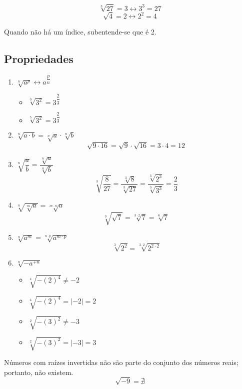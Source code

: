 \documentclass[letterpaper]{book}
\begin{document}
\[\sqrt[3]{27} = 3 \leftrightarrow 3^{3} = 27\]
\[\sqrt{4} = 2 \leftrightarrow 2^{2} = 4\]

Quando não há um índice, subentende-se que é 2.

\subsection{Propriedades}
\begin{enumerate}
    \item \(\sqrt[n]{a^{p}} \leftrightarrow a^{\dfrac{p}{n}}\)
        \begin{itemize}
            \item \(\sqrt[3]{3^{2}} = 3^{\dfrac{2}{3}}\)
            \item \(\sqrt[5]{3^{2}} = 3^{\dfrac{2}{3}}\)
        \end{itemize}
    
    \item \(\sqrt[n]{a \cdot b} = \sqrt[n]{a} \cdot \sqrt[n]{b}\)
        \[\sqrt{9 \cdot 16} = \sqrt{9} \cdot \sqrt{16} = 3 \cdot 4 = 12\]
    
    \item \(\sqrt[n]{\dfrac{a}{b}} = \dfrac{\sqrt[n]{a}}{\sqrt[n]{b}}\)
        \[\sqrt[3]{\dfrac{8}{27}} = \dfrac{\sqrt[3]{8}}{\sqrt[3]{27}} = \dfrac{\sqrt[3]{2^{3}}}{\sqrt[3]{3^{3}}} = \dfrac{2}{3}\]
    
    \item \(\sqrt[n]{\sqrt[m]{a}} = \sqrt[m \cdot n]{a}\)
        \[\sqrt[3]{\sqrt{7}} = \sqrt[3 \cdot 2]{7} = \sqrt[6]{7}\]
    
    \item \(\sqrt[n]{a^{m}} = \sqrt[n \cdot p]{a^{m \cdot p}}\)
        \[\sqrt[3]{2^{2}} = \sqrt[3 \cdot 2]{2^{2 \cdot 2}}\]
    
    \item \(\sqrt[n]{-a^{+n}}\)
        \begin{itemize}
            \item \(\sqrt[4]{-(2)^{4}} \neq -2\)
            \item \(\sqrt[4]{-(2)^{4}} = \lvert -2 \rvert = 2\)
            \item \(\sqrt[2]{-(3)^{2}} \neq -3\)
            \item \(\sqrt[2]{-(3)^{2}} = \lvert -3 \rvert = 3\)
        \end{itemize}
\end{enumerate}

Números com raízes invertidas não são parte do conjunto dos números reais; portanto, não existem.
\[\sqrt{-9} = \nexists\]
\end{document}
